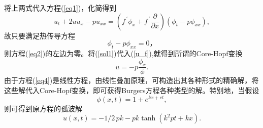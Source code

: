 \documentclass{beamer}
\begin{document}
  \begin{frame}
  将上两式代入方程(\ref{eq1})，化简得到
  \begin{equation}\label{eq2}
  u_t+2uu_x-pu_{xx}=(f^{\,'}\phi_x+f^{\,'}\frac{\partial}{\partial x})(\phi_t-p\phi_{xx}),
  \end{equation}
  故只要满足热传导方程
  \begin{equation}\label{eq4}
    \phi_t-p\phi_{xx}=0，
  \end{equation}
    则方程(\ref{eq2})的左边为零。将(\ref{sol1})代入(\ref{u_f}),就得到所谓的Core-Hopf变换
  \[
    u=-p\dfrac{\phi_x}{\phi}.
  \]
  由于方程(\ref{eq4})是线性方程，由线性叠加原理，可构造出其各种形式的精确解，将这些解代入Core-Hopf变换，即可获得Burgers方程各种类型的解。特别地，当假设
  \[
    \phi(x,t)=1+e^{kx+ct} ,
  \]
  则可得到原方程的孤波解
  \[
    u \left( x,t \right) =-1/2\,pk-pk\tanh \left( {k}^{2}pt+kx \right).
  \]
  \end{frame}
  
\end{document}
